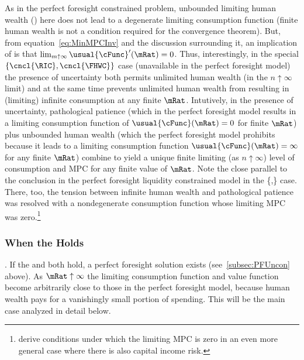 \documentclass[ProjectDLO]{subfiles}
\begin{document}
As in the perfect foresight constrained problem, unbounded limiting human wealth (\cncl{\FHWC}) here does not lead to a degenerate limiting consumption function (finite human wealth is not a condition required for the convergence theorem).  But, from equation~\eqref{eq:MinMPCInv} and the discussion surrounding it, an implication of \cncl{\RIC} is that $\lim_{m \uparrow \infty} \usual{\cFunc}^{\prime}(\mRat) = 0$.  Thus, interestingly, in the special $\{\cncl{\RIC},\cncl{\FHWC}\}$ case (unavailable in the perfect foresight model) the presence of uncertainty both permits unlimited human wealth (in the $n\uparrow\infty$ limit) and at the same time prevents unlimited human wealth from resulting in (limiting) infinite consumption at any finite $\mRat$.  Intutively, in the presence of uncertainty, pathological patience (which in the perfect foresight model results in a limiting consumption function of $\usual{\cFunc}(\mRat)=0$ for finite $\mRat$) plus unbounded human wealth (which the perfect foresight model prohibits because it leads to a limiting consumption function $\usual{\cFunc}(\mRat)=\infty$ for any finite $\mRat$) combine to yield a unique finite limiting (as $n \uparrow \infty$) level of consumption and MPC for any finite value of $\mRat$.  Note the close parallel to the conclusion in the perfect foresight liquidity constrained model in the \{\GICRaw,\cncl{\RIC}\} case.  There, too, the tension between infinite human wealth and pathological patience was resolved with a nondegenerate consumption function whose limiting MPC was zero.\footnote{\cite{maTodaRich} derive conditions under which the limiting MPC is zero in an even more general case where there is also capital income risk.}

\hypertarget{When-the-RIC-Holds}{}
\subsubsection{When the {\RIC} Holds}\label{subsubsec:WhenTheGICNrmFails}\label{subsubsec:WhenTheRICHolds}

\indent \textbf{\FHWC}.  If the {\RIC} and {\FHWC} both hold, a perfect foresight solution exists (see~\ref{subsec:PFUncon} above).  As $\mRat \uparrow \infty$ the limiting consumption function and value function become arbitrarily close to those in the perfect foresight model, because human wealth pays for a vanishingly small portion of spending.  This will be the main case analyzed in detail below.
\end{document}
